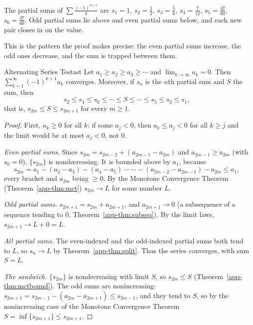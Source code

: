 \documentclass[11pt]{article}
\begin{document}
The partial sums of $\sum\frac{(-1)^{k+1}}k$ are $s_1=1$, $s_2=\frac12$, $s_3=\frac56$, $s_4=\frac7{12}$, $s_5=\frac{47}{60}$, $s_6=\frac{37}{60}$. Odd partial sums lie above and even partial sums below, and each new pair closes in on the value.

\begin{center}
\end{center}

This is the pattern the proof makes precise: the even partial sums increase, the odd ones decrease, and the sum is trapped between them.

\begin{thm}{Alternating Series Test}{ast}
Let $a_1\ge a_2\ge a_3\ge\cdots$ and $\lim_{k\to\infty}a_k=0$. Then $\displaystyle\sum_{k=1}^\infty(-1)^{k+1}a_k$ converges. Moreover, if $s_n$ is the $n$th partial sum and $S$ the sum, then
\[
s_2\le s_4\le s_6\le\cdots\le S\le\cdots\le s_5\le s_3\le s_1 ,
\]
that is, $s_{2m}\le S\le s_{2m+1}$ for every $m\ge1$.
\end{thm}
\begin{proof}
First, $a_k\ge0$ for all $k$: if some $a_j<0$, then $a_k\le a_j<0$ for all $k\ge j$ and the limit would be at most $a_j<0$, not $0$.

\emph{Even partial sums.} Since $s_{2m}=s_{2m-2}+(a_{2m-1}-a_{2m})$ and $a_{2m-1}\ge a_{2m}$ (with $s_0=0$), $\{s_{2m}\}$ is nondecreasing. It is bounded above by $a_1$, because
\[
s_{2m}=a_1-(a_2-a_3)-(a_4-a_5)-\cdots-(a_{2m-2}-a_{2m-1})-a_{2m}\le a_1 ,
\]
every bracket and $a_{2m}$ being $\ge0$. By the Monotone Convergence Theorem (Theorem~\ref{app-thm:mct}) $s_{2m}\to L$ for some number $L$.

\emph{Odd partial sums.} $s_{2m+1}=s_{2m}+a_{2m+1}$, and $a_{2m+1}\to0$ (a subsequence of a sequence tending to $0$, Theorem~\ref{app-thm:subseq}). By the limit laws, $s_{2m+1}\to L+0=L$.

\emph{All partial sums.} The even-indexed and the odd-indexed partial sums both tend to $L$, so $s_n\to L$ by Theorem~\ref{app-thm:split}. Thus the series converges, with sum $S=L$.

\emph{The sandwich.} $\{s_{2m}\}$ is nondecreasing with limit $S$, so $s_{2m}\le S$ (Theorem~\ref{app-thm:mctbound}). The odd sums are nonincreasing: $s_{2m+1}=s_{2m-1}-(a_{2m}-a_{2m+1})\le s_{2m-1}$, and they tend to $S$, so by the nonincreasing case of the Monotone Convergence Theorem $S=\inf\{s_{2m+1}\}\le s_{2m+1}$.
\end{proof}
\end{document}
